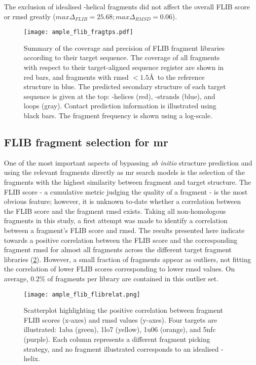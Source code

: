 The exclusion of idealised \textalpha-helical fragments did not affect the overall FLIB score or \gls{rmsd} greatly ($max \Delta_{FLIB}=25.68; max \Delta_{RMSD}=0.06$).
 
\begin{figure}[H]
	\centering
	\texttt{[image: ample\_flib\_fragtps.pdf]}
	\caption[Coverage and precision of Flib fragment libraries]{Summary of the coverage and precision of FLIB fragment libraries according to their target sequence. The coverage of all fragments with respect to their target-aligned sequence register are shown in red bars, and fragments with \gls{rmsd} $<1.5$\AA\ to the reference structure in blue. The predicted secondary structure of each target sequence is given at the top: \textalpha-helices (red), \textbeta-strands (blue), and loops (gray). Contact prediction information is illustrated using black bars. The fragment frequency is shown using a log-scale.}
	\label{fig:ample_flib_fragtps}
\end{figure}

\subsection{FLIB fragment selection for \acrlong{mr}}
One of the most important aspects of bypassing \textit{ab initio} structure prediction and using the relevant fragments directly as \gls{mr} search models is the selection of the fragments with the highest similarity between fragment and target structure. The FLIB score - a cumulative metric judging the quality of a fragment - is the most obvious feature; however, it is unknown to-date whether a correlation between the FLIB score and the fragment \gls{rmsd} exists. Taking all non-homologous fragments in this study, a first attempt was made to identify a correlation between a fragment's FLIB score and \gls{rmsd}. The results presented here indicate towards a positive correlation between the FLIB score and the corresponding fragment \gls{rmsd} for almost all fragments across the different target fragment libraries (\cref{fig:ample_flib_flibrelat}). However, a small fraction of fragments appear as outliers, not fitting the correlation of lower FLIB scores corresponding to lower \gls{rmsd} values. On average, 0.2\% of fragments per library are contained in this outlier set.

\begin{figure}[H]
	\centering
	\texttt{[image: ample\_flib\_flibrelat.png]}
	\caption[Correlation analysis for FLIB score and \gls{rmsd}]{Scatterplot highlighting the positive correlation between fragment FLIB scores (x-axes) and \gls{rmsd} values (y-axes). Four targets are illustrated: 1aba (green), 1lo7 (yellow), 1u06 (orange), and 5nfc (purple). Each column represents a different fragment picking strategy, and no fragment illustrated corresponds to an idealised \textalpha-helix.}
	\label{fig:ample_flib_flibrelat}
\end{figure}

